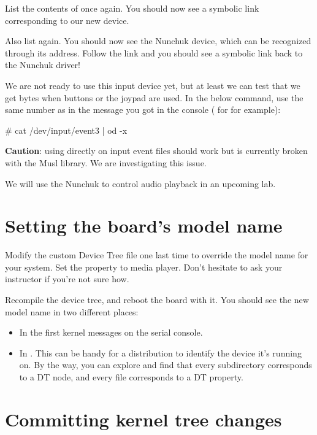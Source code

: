 List the contents of  once again. You
should now see a symbolic link corresponding to our new device.

Also list  again. You should now see the
Nunchuk device, which can be recognized through its  address.
Follow the link and you should see a symbolic link back to the Nunchuk
driver!

We are not ready to use this input device yet, but at least we can test
that we get bytes when buttons or the joypad are used. In the below
command, use the same number as in the message you got in the console
( for  for example):

\begin{bashinput}
# cat /dev/input/event3 | od -x
\end{bashinput}

{\bf Caution}: using  directly on input event files should
work but is currently broken with the Musl library. We are investigating
this issue.

We will use the Nunchuk to control audio playback in an upcoming lab.

\section{Setting the board's model name}

Modify the custom Device Tree file one last time to override the model
name for your system. Set the  property to \board media
player. Don't hesitate to ask your instructor if you're not sure how.

Recompile the device tree, and reboot the board with it. You should see
the new model name in two different places:

\begin{itemize}
\item In the first kernel messages on the serial console.
\item In . This can be
      handy for a distribution to identify the device it's running on.
      By the way, you can explore  and
      find that every subdirectory corresponds to a DT node, and every
      file corresponds to a DT property.
\end{itemize}

\section{Committing kernel tree changes}

